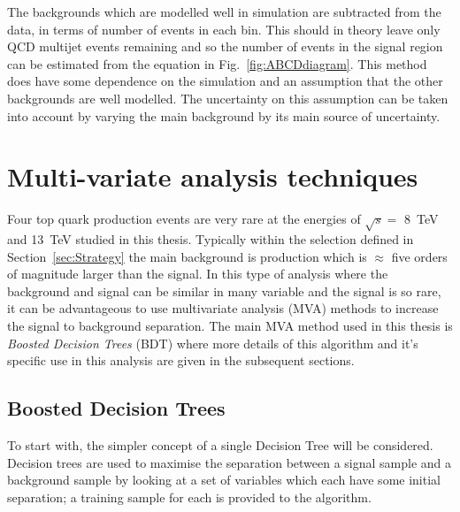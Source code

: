 
The backgrounds which are modelled well in simulation are subtracted from the data, in terms of number of events in each bin. This should in theory leave only QCD multijet events remaining and so the number of events in the signal region can be estimated from the equation in Fig.~\ref{fig:ABCDdiagram}. This method does have some dependence on the simulation and an assumption that the other backgrounds are well modelled. The uncertainty on this assumption can be taken into account by varying the main \ttbar background by its main source of uncertainty. 


\section{Multi-variate analysis techniques}

Four top quark production events are very rare at the energies of $\sqrt{s} = $ 8~TeV and 13~TeV studied in this thesis. Typically within the selection defined in Section~\ref{sec:Strategy} the main background is \ttbar production which is $\approx$ five orders of magnitude larger than the \tttt signal. In this type of analysis where the background and signal can be similar in many variable and the signal is so rare, it can be advantageous to use multivariate analysis (MVA) methods to increase the signal to background separation. The main MVA method used in this thesis is \emph{Boosted Decision Trees} (BDT) where more details of this algorithm and it's specific use in this analysis are given in the subsequent sections.


\subsection{Boosted Decision Trees}
\label{sec:BDT}

To start with, the simpler concept of a single Decision Tree will be considered. Decision trees are used to maximise the separation between a signal sample and a background sample by looking at a set of variables which each have some initial separation; a training sample for each is provided to the algorithm. 

